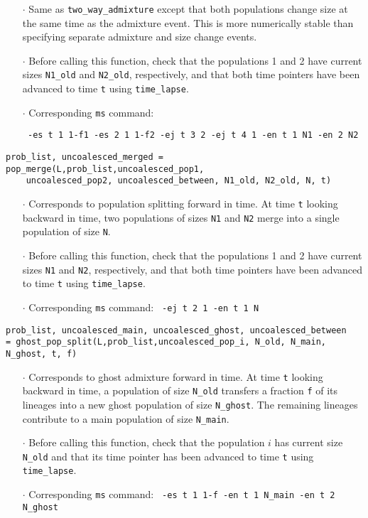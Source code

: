 \documentclass[12pt]{article}
\begin{document}
\begin{enumerate}
\item[$\cdot$] Same as \verb|two_way_admixture| except that both populations change size at the same time as the admixture event. This is more numerically stable than specifying separate admixture and size change events. 
\item[$\cdot$] Before calling this function, check that the populations 1 and 2 have current sizes \verb|N1_old| and \verb|N2_old|, respectively, and that both time pointers have been advanced to time \texttt{t} using \verb|time_lapse|.
\item[$\cdot$]Corresponding \texttt{ms} command: 

\verb| -es t 1 1-f1 -es 2 1 1-f2 -ej t 3 2 -ej t 4 1 -en t 1 N1 -en 2 N2| 
\end{enumerate}
\vspace{0.5 cm}

\begin{Verbatim}
prob_list, uncoalesced_merged = pop_merge(L,prob_list,uncoalesced_pop1, 
	uncoalesced_pop2, uncoalesced_between, N1_old, N2_old, N, t)
\end{Verbatim}

\begin{enumerate}
\item[$\cdot$] Corresponds to population splitting forward in time. At time \texttt{t} looking backward in time, two populations of sizes \texttt{N1} and \texttt{N2} merge into a single population of size \texttt{N}.
\item[$\cdot$] Before calling this function, check that the populations 1 and 2 have current sizes \verb|N1| and \verb|N2|, respectively, and that both time pointers have been advanced to time \texttt{t} using \verb|time_lapse|.
\item[$\cdot$]Corresponding \texttt{ms} command: \verb| -ej t 2 1 -en t 1 N| 
\end{enumerate}
\vspace{0.5 cm}

\begin{Verbatim}
prob_list, uncoalesced_main, uncoalesced_ghost, uncoalesced_between 
= ghost_pop_split(L,prob_list,uncoalesced_pop_i, N_old, N_main, N_ghost, t, f)
\end{Verbatim}

\begin{enumerate}
\item[$\cdot$] Corresponds to ghost admixture forward in time. At time \texttt{t} looking backward in time, a population of size \verb|N_old| transfers a fraction \texttt{f} of its lineages into a new ghost population of size \verb|N_ghost|. The remaining lineages contribute to a main population of size \verb|N_main|.
\item[$\cdot$] Before calling this function, check that the population $i$ has current size \verb|N_old| and that its time pointer has been advanced to time \texttt{t} using \verb|time_lapse|.
\item[$\cdot$]Corresponding \texttt{ms} command: \verb| -es t 1 1-f -en t 1 N_main -en t 2 N_ghost |
\end{enumerate}
\vspace{0.5 cm}
\end{document}

